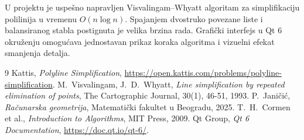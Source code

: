 \documentclass[11pt]{article}
\theoremstyle{definition}
\begin{document}
U projektu je uspešno napravljen Visvalingam--Whyatt algoritam za simplifikaciju polilinija u vremenu $O(n \log n)$. Spajanjem dvostruko povezane liste i balansiranog stabla postignuta je velika brzina rada. Grafički interfejs u Qt 6 okruženju omogućava jednostavan prikaz koraka algoritma i vizuelni efekat smanjenja detalja.

\begin{thebibliography}{9}
 Kattis, \emph{Polyline Simplification}, \url{https://open.kattis.com/problems/polyline-simplification}.
 M.~Visvalingam, J.~D.~Whyatt, \emph{Line simplification by repeated elimination of points}, The Cartographic Journal, 30(1), 46-51, 1993.
 P.~Janičić, \emph{Računarska geometrija}, Matematički fakultet u Beogradu, 2025.
 T.~H.~Cormen et al., \emph{Introduction to Algorithms}, MIT Press, 2009.
 Qt Group, \emph{Qt 6 Documentation}, \url{https://doc.qt.io/qt-6/}.
\end{thebibliography}
\end{document}
